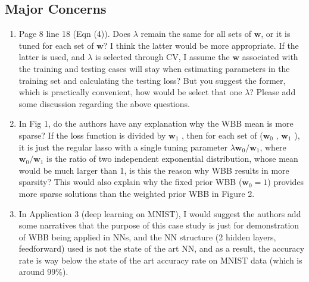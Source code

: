 \documentclass[11pt]{article}
\begin{document}
\subsection*{Major Concerns}
\begin{enumerate}
\item Page 8 line 18 (Eqn (4)). Does $\lambda$ remain the same for all sets of $\textbf{w}$, or it is tuned for each set of $\textbf{w}$? I think the latter would be more appropriate. If the latter is used, and $\lambda$ is selected through CV, I assume the $\textbf{w}$ associated with the training and testing cases will stay when estimating parameters in the training set and calculating the testing loss? But you suggest the former, which is practically convenient, how would be select that one $\lambda$? Please add some discussion regarding the above questions.


\item In Fig 1, do the authors have any explanation why the WBB mean is more sparse? If the loss function is divided by $\textbf{w}_1$ , then for each set of ($\textbf{w}_0$ , $\textbf{w}_1$ ), it is just the regular lasso with a single tuning parameter $\lambda\textbf{w}_0/\textbf{w}_1$, where $\textbf{w}_0/\textbf{w}_1$ is the ratio of two independent exponential distribution, whose mean would be much larger than 1, is this the reason why WBB results in more sparsity? This would also explain why the fixed prior WBB ($\textbf{w}_0=1$) provides more sparse solutions than the weighted prior WBB in Figure 2.

\item In Application 3 (deep learning on MNIST), I would suggest the authors add some narratives that the purpose of this case study is just for demonstration of WBB being applied in NNs, and the NN structure (2 hidden layers, feedforward) used is not the state of the art NN, and as a result, the accuracy rate is way below the state of the art accuracy rate on MNIST data (which is around 99\%).
\end{enumerate}
\end{document}
